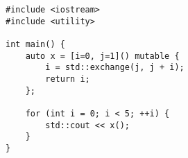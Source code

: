 \begin{lstlisting}[title=\href{https://godbolt.org/z/eTdadM}{\texttt{godbolt.org/z/eTdadM}}]
#include <iostream>
#include <utility>

int main() {
    auto x = [i=0, j=1]() mutable {
        i = std::exchange(j, j + i);
        return i;
    };

    for (int i = 0; i < 5; ++i) {
        std::cout << x();
    }
}
\end{lstlisting}
